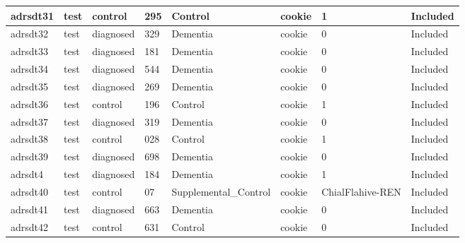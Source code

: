 \begin{center}
\begin{longtable}{|l|l|l|l|l|l|l|l|}
adrsdt31       & test                  & control           & 295                & Control              & cookie          & 1                & Included      \\ \hline
adrsdt32       & test                  & diagnosed         & 329                & Dementia             & cookie          & 0                & Included      \\ \hline
adrsdt33       & test                  & diagnosed         & 181                & Dementia             & cookie          & 0                & Included      \\ \hline
adrsdt34       & test                  & diagnosed         & 544                & Dementia             & cookie          & 0                & Included      \\ \hline
adrsdt35       & test                  & diagnosed         & 269                & Dementia             & cookie          & 0                & Included      \\ \hline
adrsdt36       & test                  & control           & 196                & Control              & cookie          & 1                & Included      \\ \hline
adrsdt37       & test                  & diagnosed         & 319                & Dementia             & cookie          & 0                & Included      \\ \hline
adrsdt38       & test                  & control           & 028                & Control              & cookie          & 1                & Included      \\ \hline
adrsdt39       & test                  & diagnosed         & 698                & Dementia             & cookie          & 0                & Included      \\ \hline
adrsdt4        & test                  & diagnosed         & 184                & Dementia             & cookie          & 1                & Included      \\ \hline
adrsdt40       & test                  & control           & 07                 & Supplemental\_Control & cookie          & ChialFlahive-REN & Included      \\ \hline
adrsdt41       & test                  & diagnosed         & 663                & Dementia             & cookie          & 0                & Included      \\ \hline
adrsdt42       & test                  & control           & 631                & Control              & cookie          & 0                & Included      \\ \hline

\end{longtable}
\end{center}
